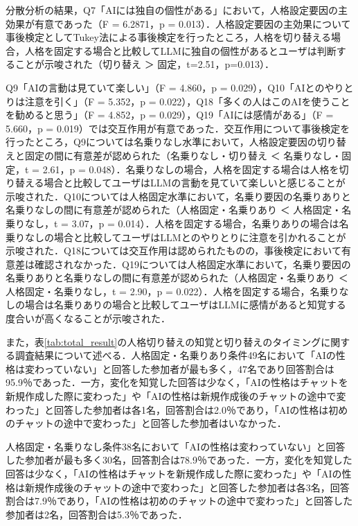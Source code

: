 \documentclass[10pt,twocolumn]{jsarticle}
\begin{document}
分散分析の結果，Q7「AIには独自の個性がある」において，人格設定要因の主効果が有意であった（F = 6.2871，p = 0.013）．人格設定要因の主効果について事後検定としてTukey法による事後検定を行ったところ，人格を切り替える場合，人格を固定する場合と比較してLLMに独自の個性があるとユーザは判断することが示唆された（切り替え ＞ 固定，t=2.51，p=0.013）．

Q9「AIの言動は見ていて楽しい」（F = 4.860，p = 0.029），Q10「AIとのやりとりは注意を引く」（F = 5.352，p = 0.022），Q18「多くの人はこのAIを使うことを勧めると思う」（F = 4.852，p = 0.029），Q19「AIには感情がある」（F = 5.660，p = 0.019）では交互作用が有意であった．交互作用について事後検定を行ったところ，Q9については名乗りなし水準において，人格設定要因の切り替えと固定の間に有意差が認められた（名乗りなし・切り替え ＜ 名乗りなし・固定，t = 2.61，p = 0.048）．名乗りなしの場合，人格を固定する場合は人格を切り替える場合と比較してユーザはLLMの言動を見ていて楽しいと感じることが示唆された．Q10については人格固定水準において，名乗り要因の名乗りありと名乗りなしの間に有意差が認められた（人格固定・名乗りあり ＜ 人格固定・名乗りなし，t = 3.07，p = 0.014）．人格を固定する場合，名乗りありの場合は名乗りなしの場合と比較してユーザはLLMとのやりとりに注意を引かれることが示唆された．Q18については交互作用は認められたものの，事後検定において有意差は確認されなかった．Q19については人格固定水準において，名乗り要因の名乗りありと名乗りなしの間に有意差が認められた（人格固定・名乗りあり ＜ 人格固定・名乗りなし，t = 2.90，p = 0.022）．人格を固定する場合，名乗りなしの場合は名乗りありの場合と比較してユーザはLLMに感情があると知覚する度合いが高くなることが示唆された．

また，表\ref{tab:total_result}の人格切り替えの知覚と切り替えのタイミングに関する調査結果について述べる．人格固定・名乗りあり条件49名において「AIの性格は変わっていない」と回答した参加者が最も多く，47名であり回答割合は95.9％であった．一方，変化を知覚した回答は少なく，「AIの性格はチャットを新規作成した際に変わった」や「AIの性格は新規作成後のチャットの途中で変わった」と回答した参加者は各1名，回答割合は2.0％であり，「AIの性格は初めのチャットの途中で変わった」と回答した参加者はいなかった．

人格固定・名乗りなし条件38名において「AIの性格は変わっていない」と回答した参加者が最も多く30名，回答割合は78.9％であった．一方，変化を知覚した回答は少なく，「AIの性格はチャットを新規作成した際に変わった」や「AIの性格は新規作成後のチャットの途中で変わった」と回答した参加者は各3名，回答割合は7.9％であり，「AIの性格は初めのチャットの途中で変わった」と回答した参加者は2名，回答割合は5.3％であった．
\end{document}
